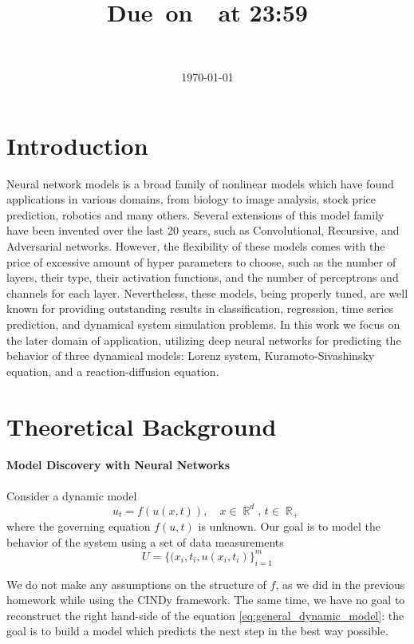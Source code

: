 \documentclass{article}
\title{
    \textmd{\textbf{\hmwkClass\\\ \hmwkTitle}}\\
    \normalsize\vspace{0.1in}\small{Due\ on\ \hmwkDueDate\ at 23:59}\\
    \vspace{0.1in}\large{\textit{\hmwkClassInstructor}}
    \justify{\textbf{Abstract: }\hmwkAbstract}
}
\author{\hmwkAuthorName\\ \hmwkAuthorEmail}
\date{\today}
\DeclareMathOperator{\R}{\mathbb{R}}
\begin{document}
\maketitle
\section{Introduction}
Neural network models is a broad family of nonlinear models which have found applications in various domains, from biology to image analysis, stock price prediction, robotics and many others. Several extensions of this model family have been invented over the last 20 years, such as Convolutional, Recursive, and Adversarial networks. However, the flexibility of these models comes with the price of excessive amount of hyper parameters to choose, such as the number of layers, their type, their activation functions, and the number of perceptrons and channels for each layer. Nevertheless, these models, being properly tuned, are well known for providing outstanding results in classification, regression, time series prediction, and dynamical system simulation problems. In this work we focus on the later domain of application, utilizing deep neural networks for predicting the behavior of three dynamical models: Lorenz system, Kuramoto-Sivashinsky equation, and a reaction-diffusion equation. 

\section{Theoretical Background}
\paragraph{Model Discovery with Neural Networks}
Consider a dynamic model 
    \begin{equation}
    \label{eq:general_dynamic_model}
        u_t = f(u(x,t)), \quad x \in \R^d, \, t \in \R_+
    \end{equation}
    where the governing equation $f(u, t)$ is unknown. Our goal is to model the behavior of the system using a set of data measurements 
    \[
        U = \{(x_i, t_i, u(x_i, t_i)\}_{i=1}^{m}
    \]
    
    We do not make any assumptions on the structure of $f$, as we did in the previous homework while using the CINDy framework. The same time, we have no goal to reconstruct the right hand-side of the equation \ref{eq:general_dynamic_model}: the goal is to build a model which predicts the next step in the best way possible. 
        
\end{document}
